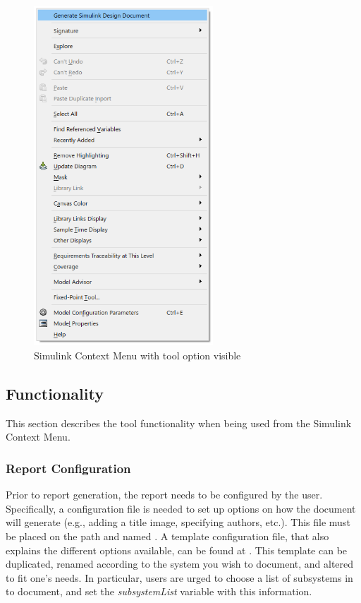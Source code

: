 \documentclass{article}
\begin{document}
\begin{figure}
	\centering
	\includegraphics[width=0.6\textwidth]{../../figs/ContextMenu}
	\caption{Simulink Context Menu with tool option visible}
	\label{FIG:contextMenu}
\end{figure}

\subsection{Functionality}

This section describes the tool functionality when being used from the Simulink Context Menu.

\subsubsection{Report Configuration}
Prior to report generation, the report needs to be configured by the user. Specifically, a configuration file is needed to set up options on how the document will generate (e.g., adding a title image, specifying authors, etc.).
This file must be placed on the \matlab path and named . A template configuration file, that also explains the different options available, can be found at . This template can be duplicated, renamed according to the system you wish to document, and altered to fit one's needs. In particular, users are urged to choose a list of subsystems in  to document, and set the \emph{subsystemList} variable with this information.
\end{document}

